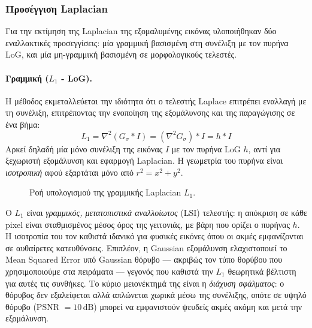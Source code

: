 \documentclass[12pt, a4paper]{article}
\begin{document}
\subsubsection{Προσέγγιση Laplacian}

Για την εκτίμηση της Laplacian της εξομαλυμένης εικόνας υλοποιήθηκαν δύο
εναλλακτικές προσεγγίσεις: μία γραμμική βασισμένη στη συνέλιξη με τον
πυρήνα LoG, και μία μη-γραμμική βασισμένη σε μορφολογικούς τελεστές.

\paragraph{Γραμμική ($L_1$ - LoG).}
Η μέθοδος εκμεταλλεύεται την ιδιότητα ότι ο τελεστής Laplace επιτρέπει
εναλλαγή με τη συνέλιξη, επιτρέποντας την ενοποίηση της εξομάλυνσης
και της παραγώγισης σε ένα βήμα:
\begin{equation}
    L_1 = \nabla^2(G_\sigma * I) = (\nabla^2 G_\sigma) * I = h * I
\end{equation}
Αρκεί δηλαδή μία μόνο συνέλιξη της εικόνας $I$ με τον πυρήνα LoG $h$,
αντί για ξεχωριστή εξομάλυνση και εφαρμογή Laplacian. Η γεωμετρία του
πυρήνα είναι \emph{ισοτροπική} αφού εξαρτάται μόνο από $r^2 = x^2+y^2$.

\begin{figure}[H]
\centering
{}
\caption{Ροή υπολογισμού της γραμμικής Laplacian $L_1$.}
\label{fig:l1_flow}
\end{figure}

Ο $L_1$ είναι \emph{γραμμικός, μετατοπιστικά αναλλοίωτος} (LSI) τελεστής:
η απόκριση σε κάθε pixel είναι σταθμισμένος μέσος όρος της γειτονιάς, με
βάρη που ορίζει ο πυρήνας $h$. Η ισοτροπία του τον καθιστά ιδανικό για
φυσικές εικόνες όπου οι ακμές εμφανίζονται σε αυθαίρετες κατευθύνσεις.
Επιπλέον, η Gaussian εξομάλυνση ελαχιστοποιεί το Mean Squared Error υπό
Gaussian θόρυβο — ακριβώς τον τύπο θορύβου που χρησιμοποιούμε στα πειράματα
— γεγονός που καθιστά την $L_1$ θεωρητικά βέλτιστη για αυτές τις συνθήκες.
Το κύριο μειονέκτημά της είναι η \emph{διάχυση σφάλματος}: ο θόρυβος δεν
εξαλείφεται αλλά απλώνεται χωρικά μέσω της συνέλιξης, οπότε σε υψηλό
θόρυβο (PSNR $=10\,\text{dB}$) μπορεί να εμφανιστούν ψευδείς ακμές ακόμη
και μετά την εξομάλυνση.
\end{document}
